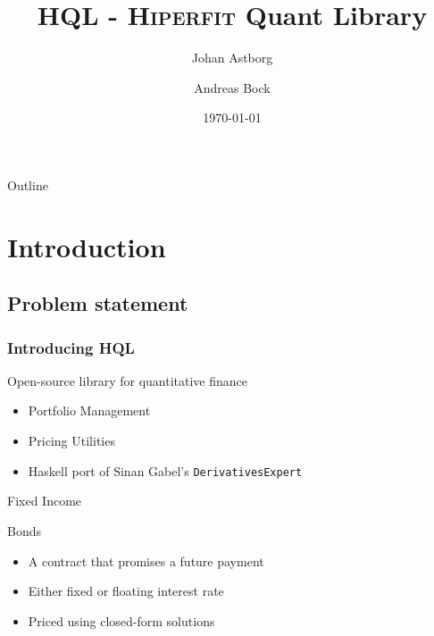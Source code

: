 \documentclass[]{beamer}
\title{\textbf{HQL} - \textsc{Hiperfit} Quant Library}    %
\author[shortname]{Johan Astborg \inst{1} \and Andreas Bock \inst{2}}
\institute[shortinst]{\inst{1} Lund University \and %
                      \inst{2} University of Copenhagen}
\date{\today}
\begin{document}
\begin{frame}
  \titlepage
\end{frame}


\begin{frame}{Outline}
  \tableofcontents
\end{frame}

\section{Introduction}

\subsection{Problem statement}
\begin{frame}
  \frametitle{Introducing HQL}   %
  \begin{block}{Open-source library for quantitative finance}
  \begin{itemize}
    \item Portfolio Management
    \item Pricing Utilities
    \item Haskell port of Sinan Gabel's \texttt{DerivativesExpert}
  \end{itemize}
  \end{block}
\end{frame}
\note[enumerate]       %
{                      %
}

\begin{frame}{Fixed Income}
    \begin{block}{Bonds}
    \begin{itemize}
       \item A contract that promises a future payment
       \item Either fixed or floating interest rate
       \item Priced using closed-form solutions
    \end{itemize}
    \end{block}
\end{frame}
\end{document}
